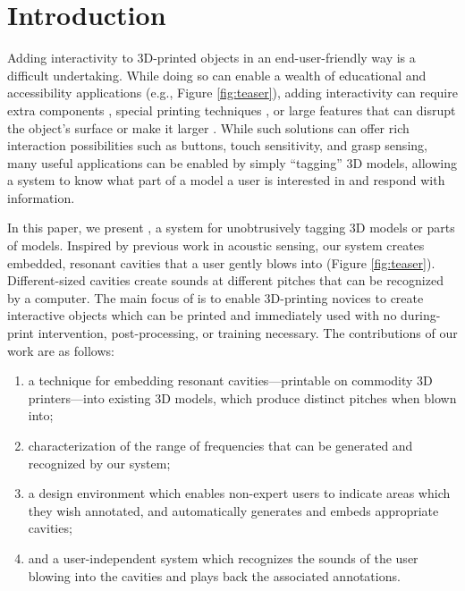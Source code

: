   \section{Introduction}
    Adding interactivity to 3D-printed objects in an end-user-friendly way is a
    difficult undertaking. While doing so can enable a wealth of educational and
    accessibility applications (e.g., Figure \ref{fig:teaser}), adding
    interactivity can require extra components \cite{Savage:2013, Nappey:2014},
    special printing techniques \cite{Schmitz:2015, Bacher:2016, Peng:2015}, or
    large features that can disrupt the object's surface \cite{Harrison:2012kw,
    Ou:2016a, Savage:2015, Shi:2016} or make it larger \cite{Li:2016}. While
    such solutions can offer rich interaction possibilities such as buttons,
    touch sensitivity, and grasp sensing, many useful applications can be
    enabled by simply ``tagging'' 3D models, allowing a system to know what part
    of a model a user is interested in and respond with information.
    
    In this paper, we present \textit{\bh}, a system for unobtrusively tagging
    3D models or parts of models. Inspired by previous work in acoustic sensing,
    our system creates embedded, resonant cavities that a user gently blows into
    (Figure \ref{fig:teaser}). Different-sized cavities create sounds at
    different pitches that can be recognized by a computer. The main focus of
    \bh is to enable 3D-printing novices to create interactive objects which can
    be printed and immediately used with no during-print intervention,
    post-processing, or training necessary. The contributions of our work are as
    follows:

    \begin{enumerate}
        \item a technique for embedding resonant cavities---printable on
          commodity 3D printers---into existing 3D models, which produce distinct
          pitches when blown into;
        \item characterization of the range of frequencies that can be generated
          and recognized by our system;
        \item a design environment which enables non-expert users to indicate
          areas which they wish annotated, and automatically generates and embeds
          appropriate cavities;
        \item and a user-independent system which recognizes the sounds of the
          user blowing into the cavities and plays back the associated
          annotations.
    \end{enumerate}

